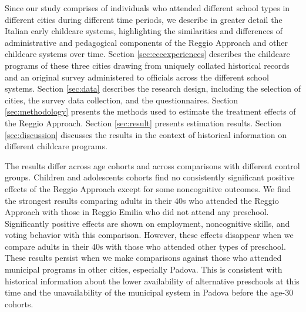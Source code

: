 Since our study comprises of individuals who attended different school types in different cities during different time periods, we describe in greater detail the Italian early childcare systems, highlighting the similarities and differences of administrative and pedagogical components of the Reggio Approach and other childcare systems over time. Section \ref{sec:eceexperiences} describes the childcare programs of these three cities drawing from uniquely collated historical records and an original survey administered to officials across the different school systems. Section \ref{sec:data} describes the research design, including the selection of cities, the survey data collection, and the questionnaires. Section \ref{sec:methodology} presents the methods used to estimate the treatment effects of the Reggio Approach. Section \ref{sec:result} presents estimation results. Section \ref{sec:discussion} discusses the results in the context of historical information on different childcare programs. 

The results differ across age cohorts and across comparisons with different control groups. Children and adolescents cohorts find no consistently significant positive effects of the Reggio Approach except for some noncognitive outcomes. We find the strongest results comparing adults in their 40s who attended the Reggio Approach with those in Reggio Emilia who did not attend any preschool. Significantly positive effects are shown on employment, noncognitive skills, and voting behavior with this comparison. However, these effects disappear when we compare adults in their 40s with those who attended other types of preschool. These results persist when we make comparisons against those who attended municipal programs in other cities, especially Padova. This is consistent with historical information about the lower availability of alternative preschools at this time and the unavailability of the municipal system in Padova before the age-30 cohorts.
